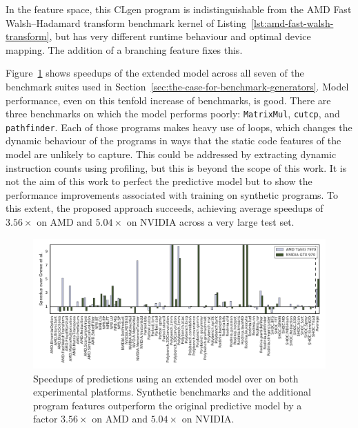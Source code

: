 \begin{listing}
  \inputminted{opencl_lexer.py:OpenCLLexer -x}{lst/amd-fast-walsh-transform-equivalent.cl}
  \caption[Synthesised program with same features as an AMD benchmark]{In the \citeauthor{Grewe2013} feature space, this CLgen program is indistinguishable from the AMD Fast Walsh–Hadamard transform benchmark kernel of Listing~\ref{lst:amd-fast-walsh-transform}, but has very different runtime behaviour and optimal device mapping. The addition of a branching feature fixes this.}
  \label{lst:zero-b}
\end{listing}

Figure~\ref{fig:ex2} shows speedups of the extended model across all seven of the benchmark suites used in Section~\ref{sec:the-case-for-benchmark-generators}. Model performance, even on this tenfold increase of benchmarks, is good. There are three benchmarks on which the model performs poorly: \texttt{MatrixMul}, \texttt{cutcp}, and \texttt{pathfinder}. Each of those programs makes heavy use of loops, which changes the dynamic behaviour of the programs in ways that the static code features of the model are unlikely to capture. This could be addressed by extracting dynamic instruction counts using profiling, but this is beyond the scope of this work. It is not the aim of this work to perfect the predictive model but to show the performance improvements associated with training on synthetic programs. To this extent, the proposed approach succeeds, achieving average speedups of $3.56\times$ on AMD and $5.04\times$ on NVIDIA across a very large test set.

\begin{figure}
  \centering%
  \includegraphics[width=1.45\textwidth,angle=270]{img/ex2}%
  \caption[Speedups of predictions using extended model over state-of-the-art]{%
    Speedups of predictions using an extended model over \citeauthor{Grewe2013} on both experimental platforms. Synthetic benchmarks and the additional program features outperform the original predictive model by a factor $3.56\times$ on AMD and $5.04\times$ on NVIDIA.%
  }%
  \label{fig:ex2}%
\end{figure}


